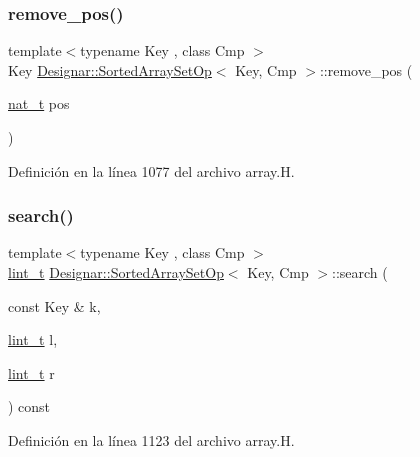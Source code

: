 \subsubsection{\texorpdfstring{remove\+\_\+pos()}{remove\_pos()}}
{\footnotesize\ttfamily template$<$typename Key , class Cmp $>$ \\
Key \hyperlink{class_designar_1_1_sorted_array_set_op}{Designar\+::\+Sorted\+Array\+Set\+Op}$<$ Key, Cmp $>$\+::remove\+\_\+pos (\begin{DoxyParamCaption}\item[{\hyperlink{namespace_designar_aa72662848b9f4815e7bf31a7cf3e33d1}{nat\+\_\+t}}]{pos }\end{DoxyParamCaption})\hspace{0.3cm}{\ttfamily [inline]}}



Definición en la línea 1077 del archivo array.\+H.

\mbox{\label{class_designar_1_1_sorted_array_set_op_ab0dc92fe501e3349041aaafea39a6526}} 
\subsubsection{\texorpdfstring{search()}{search()}}
{\footnotesize\ttfamily template$<$typename Key , class Cmp $>$ \\
\hyperlink{namespace_designar_a9d113d66a39e82b73727c72cd3a52f73}{lint\+\_\+t} \hyperlink{class_designar_1_1_sorted_array_set_op}{Designar\+::\+Sorted\+Array\+Set\+Op}$<$ Key, Cmp $>$\+::search (\begin{DoxyParamCaption}\item[{const Key \&}]{k,  }\item[{\hyperlink{namespace_designar_a9d113d66a39e82b73727c72cd3a52f73}{lint\+\_\+t}}]{l,  }\item[{\hyperlink{namespace_designar_a9d113d66a39e82b73727c72cd3a52f73}{lint\+\_\+t}}]{r }\end{DoxyParamCaption}) const\hspace{0.3cm}{\ttfamily [protected]}}



Definición en la línea 1123 del archivo array.\+H.

\mbox{\label{class_designar_1_1_sorted_array_set_op_a4daae3c1bd56ec08a02ce5a5f231aade}} 
